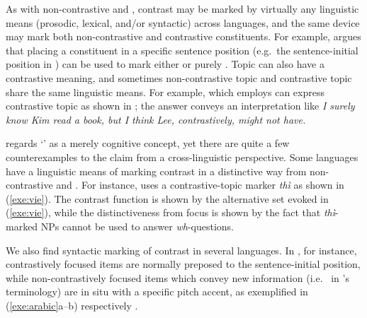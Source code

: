 As with non-contrastive  and , contrast may be marked by
virtually any linguistic means (prosodic, lexical, and/or syntactic)
across languages, and the same device may mark both non-contrastive
and contrastive constituents.  For example, \citet[296]{gundel:99}
argues that placing a constituent in a specific sentence position
(e.g.\ the sentence-initial position in ) can be used to mark
either  or purely .  Topic can
also have a contrastive meaning, and sometimes non-contrastive topic
and contrastive topic share the same linguistic means.  For example,
 which employs \nun can express contrastive topic as shown
in ; the answer conveys an
interpretation like \textit{I surely know Kim read a book, but I think
  Lee, contrastively, might not have.}



\cite{lambrecht:96} regards `' as a merely cognitive
concept, yet there are quite a few counterexamples to the claim from a
cross-linguistic perspective. Some languages have a linguistic means
of marking contrast in a distinctive way from non-contrastive 
and . For instance,  uses a contrastive-topic
marker \textit{th{\`i}} \citep{nguyen:06} as shown in (\ref{exe:vie}).
The contrast function is shown by the alternative set evoked in
(\ref{exe:vie}), while the distinctiveness from focus is shown by the
fact that \textit{th{\`i}}-marked NPs cannot be used to answer
\textit{wh}-questions.





\noindent We also find syntactic marking of contrast in several
languages. In , for instance, contrastively
focused items are normally preposed 
to the sentence-initial position,
while non-contrastively focused items which convey new information
(i.e.\  in \citeauthor{gundel:99}'s terminology) are
in situ with a specific pitch accent, as exemplified in
(\ref{exe:arabic}a--b) respectively \citep{ouhalla:99}.


